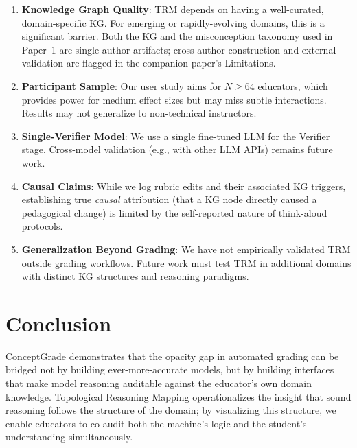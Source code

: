\documentclass[journal,review]{vgtc}
\begin{document}
\begin{enumerate}
  \item \textbf{Knowledge Graph Quality}: TRM depends on having a well-curated, domain-specific KG. For emerging or rapidly-evolving domains, this is a significant barrier. Both the KG and the misconception taxonomy used in Paper~1 are single-author artifacts; cross-author construction and external validation are flagged in the companion paper's Limitations.
  \item \textbf{Participant Sample}: Our user study aims for $N \geq 64$ educators, which provides power for medium effect sizes but may miss subtle interactions. Results may not generalize to non-technical instructors.

  \item \textbf{Single-Verifier Model}: We use a single fine-tuned LLM for the Verifier stage. Cross-model validation (e.g., with other LLM APIs) remains future work.

  \item \textbf{Causal Claims}: While we log rubric edits and their associated KG triggers, establishing true \textit{causal} attribution (that a KG node directly caused a pedagogical change) is limited by the self-reported nature of think-aloud protocols.

  \item \textbf{Generalization Beyond Grading}: We have not empirically validated TRM outside grading workflows. Future work must test TRM in additional domains with distinct KG structures and reasoning paradigms.
\end{enumerate}


\section{Conclusion}

ConceptGrade demonstrates that the opacity gap in automated grading can be bridged not by building ever-more-accurate models, but by building interfaces that make model reasoning auditable against the educator's own domain knowledge. Topological Reasoning Mapping operationalizes the insight that sound reasoning follows the structure of the domain; by visualizing this structure, we enable educators to co-audit both the machine's logic and the student's understanding simultaneously.
\end{document}
